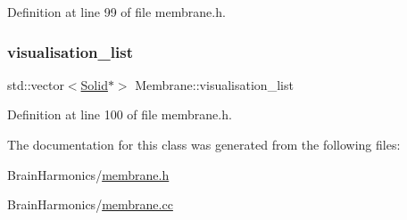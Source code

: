 Definition at line 99 of file membrane.\+h.

\mbox{\label{class_membrane_a926d35c07f664b60deb6e9f87649fe89}} 
\subsubsection{\texorpdfstring{visualisation\+\_\+list}{visualisation\_list}}
{\footnotesize\ttfamily std\+::vector$<$\hyperlink{class_solid}{Solid}$\ast$$>$ Membrane\+::visualisation\+\_\+list\hspace{0.3cm}{\ttfamily [protected]}}



Definition at line 100 of file membrane.\+h.



The documentation for this class was generated from the following files\+:\begin{DoxyCompactItemize}
\item 
Brain\+Harmonics/\hyperlink{membrane_8h}{membrane.\+h}\item 
Brain\+Harmonics/\hyperlink{membrane_8cc}{membrane.\+cc}\end{DoxyCompactItemize}
